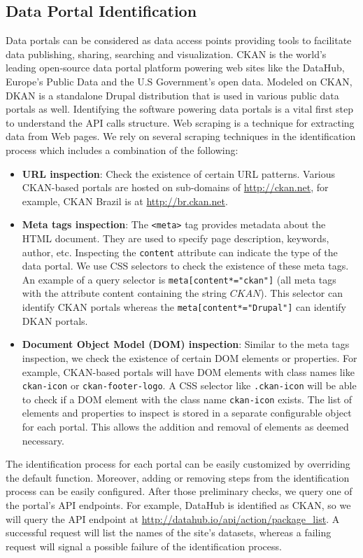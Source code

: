\documentclass{sig-alternate}
\begin{document}
\subsection{Data Portal Identification}
Data portals can be considered as data access points providing tools to facilitate data publishing, sharing, searching and visualization. CKAN is the world's leading open-source data portal platform powering web sites like the DataHub, Europe's Public Data and the U.S Government's open data. Modeled on CKAN, DKAN is a standalone Drupal distribution that is used in various public data portals as well. Identifying the software powering data portals is a vital first step to understand the API calls structure. Web scraping is a technique for extracting data from Web pages. We rely on several scraping techniques in the identification process which includes a combination of the following:
\begin{itemize}
  \item \textbf{URL inspection}: Check the existence of certain URL patterns. Various CKAN-based portals are hosted on sub-domains of \url{http://ckan.net}, for example, CKAN Brazil is at \url{http://br.ckan.net}.
  \item \textbf{Meta tags inspection}: The \texttt{<meta>} tag provides metadata about the HTML document. They are used to specify page description, keywords, author, etc. Inspecting the \texttt{content} attribute can indicate the type of the data portal. We use CSS selectors to check the existence of these meta tags. An example of a query selector is \texttt{meta[content*="ckan"]} (all meta tags with the attribute content containing the string $CKAN$). This selector can identify CKAN portals whereas the \texttt{meta[content*="Drupal"]} can identify DKAN portals.
  \item \textbf{Document Object Model (DOM) inspection}: Similar to the meta tags inspection, we check the existence of certain DOM elements or properties. For example, CKAN-based portals will have DOM elements with class names like \texttt{ckan-icon} or \texttt{ckan-footer-logo}. A CSS selector like \texttt{.ckan-icon} will be able to check if a DOM element with the class name \texttt{ckan-icon} exists. The list of elements and properties to inspect is stored in a separate configurable object for each portal. This allows the addition and removal of elements as deemed necessary.
\end{itemize}

The identification process for each portal can be easily customized by overriding the default function. Moreover, adding or removing steps from the identification process can be easily configured. After those preliminary checks, we query one of the portal's API endpoints. For example, DataHub is identified as CKAN, so we will query the API endpoint at \url{http://datahub.io/api/action/package_list}. A successful request will list the names of the site's datasets, whereas a failing request will signal a possible failure of the identification process.
\end{document}
